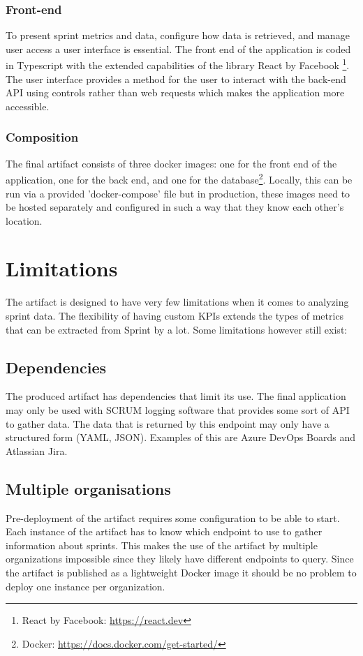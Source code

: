 \subsubsection{Front-end}

To present sprint metrics and data, configure how data is retrieved,
and manage user access a user interface is essential.
The front end of the application is coded in Typescript with the
extended capabilities of the library React by Facebook 
\footnote{React by Facebook: \url{https://react.dev}}. 
The user interface provides a method for the user to interact with the back-end API using controls rather than web requests which makes the application more accessible.  

\subsubsection{Composition}

The final artifact consists of three docker images: 
one for the front end of the application, one for the back end,
and one for the database\footnote{Docker: \url{https://docs.docker.com/get-started/}}.
Locally, this can be run via a provided 'docker-compose' file but in production,
these images need to be hosted separately and configured in such a 
way that they know each other's location.

\section{Limitations}

The artifact is designed to have very few limitations when it comes to analyzing sprint data. 
The flexibility of having custom KPIs extends the types of metrics that can be extracted 
from Sprint by a lot. Some limitations however still exist:

\subsection*{Dependencies}

The produced artifact has dependencies that limit its use. The final application may only be used with SCRUM logging software that provides some sort of API to gather data. The data that is returned by this endpoint may only have a structured form (YAML, JSON). Examples of this are Azure DevOps Boards and Atlassian Jira.

\subsection*{Multiple organisations}
Pre-deployment of the artifact requires some configuration to be able to start. Each instance of the artifact has to know which endpoint to use to gather information about sprints. This makes the use of the artifact by multiple organizations impossible since they likely have different endpoints to query. Since the artifact is published as a lightweight Docker image it should be no problem to deploy one instance per organization. 

